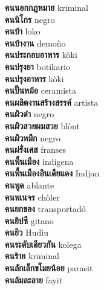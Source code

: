 \textbf{ คนนอกกฎหมาย  } kriminal \\
\textbf{ คนนิโกร  } negro \\
\textbf{ คนบ้า  } loko \\
\textbf{ คนบ้างาน  } demoño \\
\textbf{ คนประกอบอาหาร  } kòki \\
\textbf{ คนปรุงยา  } botikario \\
\textbf{ คนปรุงอาหาร  } kòki \\
\textbf{ คนปั้นหม้อ  } ceramista \\
\textbf{ คนผลิตงานสร้างสรรค์  } artista \\
\textbf{ คนผิวดำ  } negro \\
\textbf{ คนผิวสวยผมสวย  } blònt \\
\textbf{ คนผิวหมึก  } negro \\
\textbf{ คนฝรั่งเศส  } franses \\
\textbf{ คนพื้นเมือง  } indígena \\
\textbf{ คนพื้นเมืองอินเดียแดง  } Indjan \\
\textbf{ คนพูด  } ablante \\
\textbf{ คนพเนจร  } chòler \\
\textbf{ คนยกของ  } transportadó \\
\textbf{ คนยิปซี  } gitano \\
\textbf{ คนยิว  } Hudiu \\
\textbf{ คนระดับเดียวกัน  } kolega \\
\textbf{ คนร้าย  } kriminal \\
\textbf{ คนลักเล็กขโมยน้อย  } parasit \\
\textbf{ คนล้มละลาย  } fayit \\
